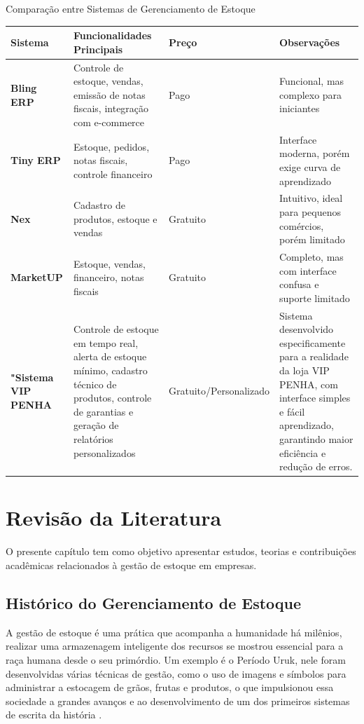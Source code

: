 \documentclass[
	12pt,				%
	openany,			%
	twoside,			%
	a4paper,			%
	english,			%
	brazil				%
	]{abntex2}
\begin{document}
\begin{quadro}[htb]
\caption{\label{quadro_comparativo}Comparação entre Sistemas de Gerenciamento de Estoque}
\begin{tabular}{|p{3.2cm}|p{5.5cm}|p{2.2cm}|p{4.1cm}|}
\hline
\textbf{Sistema} & \textbf{Funcionalidades Principais} & \textbf{Preço} & \textbf{Observações} \\
\hline
\textbf{Bling ERP} & Controle de estoque, vendas, emissão de notas fiscais, integração com e-commerce & Pago & Funcional, mas complexo para iniciantes \\
\hline
\textbf{Tiny ERP} & Estoque, pedidos, notas fiscais, controle financeiro & Pago & Interface moderna, porém exige curva de aprendizado \\
\hline
\textbf{Nex} & Cadastro de produtos, estoque e vendas & Gratuito & Intuitivo, ideal para pequenos comércios, porém limitado \\
\hline
\textbf{MarketUP} & Estoque, vendas, financeiro, notas fiscais & Gratuito & Completo, mas com interface confusa e suporte limitado \\
\hline
\textbf{"Sistema VIP PENHA} & Controle de estoque em tempo real, alerta de estoque mínimo, cadastro técnico de produtos, controle de garantias e geração de relatórios personalizados & Gratuito/Personalizado & Sistema desenvolvido especificamente para a realidade da loja VIP PENHA, com interface simples e fácil aprendizado, garantindo maior eficiência e redução de erros. \\
\hline
\end{tabular}
\end{quadro}



\chapter{Revisão da Literatura}
O presente capítulo tem como objetivo apresentar estudos, teorias e contribuições acadêmicas relacionados à gestão de estoque em empresas.
\section{Histórico do Gerenciamento de Estoque}
A gestão de estoque é uma prática que acompanha a humanidade há milênios, realizar uma armazenagem inteligente dos recursos se mostrou essencial para a raça humana desde o seu primórdio. Um exemplo é o Período Uruk, nele foram desenvolvidas várias técnicas de gestão, como o uso de imagens e símbolos para administrar a estocagem de grãos, frutas e produtos, o que impulsionou essa sociedade a grandes avanços e ao desenvolvimento de um dos primeiros sistemas de escrita da história \cite{Albright1996}.
\end{document}
